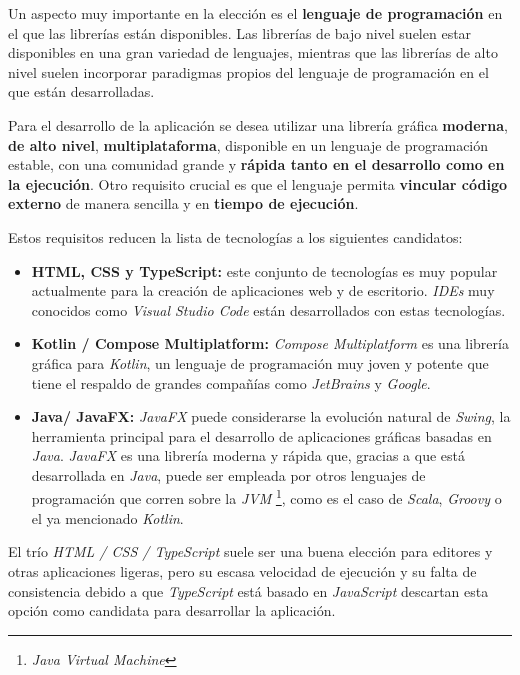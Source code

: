 Un aspecto muy importante en la elección es el \textbf{lenguaje de programación}
en el que las librerías están disponibles.
Las librerías de bajo nivel suelen estar disponibles en una gran variedad de lenguajes, mientras que las
librerías de alto nivel suelen incorporar paradigmas propios del lenguaje de programación en el que están
desarrolladas.

Para el desarrollo de la aplicación se desea utilizar una librería gráfica \textbf{moderna},
\textbf{de alto nivel}, \textbf{multiplataforma}, disponible en un lenguaje de programación estable,
con una comunidad grande y \textbf{rápida tanto en el desarrollo como en la ejecución}.
Otro requisito crucial es que el lenguaje permita \textbf{vincular código externo} de manera
sencilla y en \textbf{tiempo de ejecución}.

Estos requisitos reducen la lista de tecnologías a los siguientes candidatos:
\begin{itemize}
    \item \textbf{HTML, CSS y TypeScript:} este conjunto de tecnologías es muy popular actualmente
    para la creación de aplicaciones web y de escritorio. \textit{IDEs} muy conocidos como
    \textit{Visual Studio Code} están desarrollados con estas tecnologías.
    \item \textbf{Kotlin / Compose Multiplatform:} \textit{Compose Multiplatform} es una librería gráfica
    para \textit{Kotlin}, un lenguaje de programación muy joven y potente que tiene el respaldo de
    grandes compañías como \textit{JetBrains} y \textit{Google}.
    \item \textbf{Java/ JavaFX:}
    \textit{JavaFX} puede considerarse la evolución natural de \textit{Swing},
    la herramienta principal para el desarrollo de aplicaciones gráficas basadas en \textit{Java}.
    \textit{JavaFX} es una librería moderna y rápida que, gracias a que está desarrollada en \textit{Java},
    puede ser empleada por otros lenguajes de programación que corren sobre la \textit{JVM}
    \footnote{\textit{Java Virtual Machine}}, como es el caso de \textit{Scala}, \textit{Groovy} o el ya mencionado
    \textit{Kotlin}.
\end{itemize}

El trío \textit{HTML / CSS / TypeScript} suele ser una buena elección para
editores y otras aplicaciones ligeras, pero su escasa velocidad de ejecución
y su falta de consistencia debido a que \textit{TypeScript} está basado
en \textit{JavaScript} descartan esta opción como candidata
para desarrollar la aplicación.

